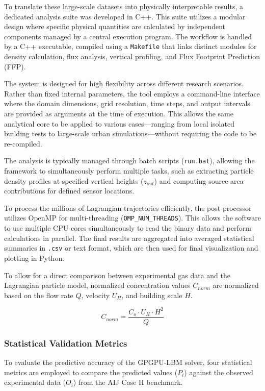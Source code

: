 To translate these large-scale datasets into physically interpretable results, a dedicated analysis suite was developed in C++. This suite utilizes a modular design where specific physical quantities are calculated by independent components managed by a central execution program. The workflow is handled by a C++ executable, compiled using a \texttt{Makefile} that links distinct modules for density calculation, flux analysis, vertical profiling, and Flux Footprint Prediction (FFP).

The system is designed for high flexibility across different research scenarios. Rather than fixed internal parameters, the tool employs a command-line interface where the domain dimensions, grid resolution, time steps, and output intervals are provided as arguments at the time of execution. This allows the same analytical core to be applied to various cases—ranging from local isolated building tests to large-scale urban simulations—without requiring the code to be re-compiled.
 
The analysis is typically managed through batch scripts (\texttt{run.bat}), allowing the framework to simultaneously perform multiple tasks, such as extracting particle density profiles at specified vertical heights ($z_{out}$) and computing source area contributions for defined sensor locations. 

To process the millions of Lagrangian trajectories efficiently, the post-processor utilizes OpenMP for multi-threading (\texttt{OMP\_NUM\_THREADS}). This allows the software to use multiple CPU cores simultaneously to read the binary data and perform calculations in parallel. The final results are aggregated into averaged statistical summaries in \texttt{.csv} or text format, which are then used for final visualization and plotting in Python.

To allow for a direct comparison between experimental gas data and the Lagrangian particle model, normalized concentration values $C_{norm}$ are normalized based on the flow rate $Q$, velocity $U_H$, and building scale $H$.

\begin{equation}
    C_{norm} = \frac{C_o \cdot U_H \cdot H^2}{Q}
\end{equation}

\subsubsection{Statistical Validation Metrics}

To evaluate the predictive accuracy of the GPGPU-LBM solver, four statistical metrics are employed to compare the predicted values ($P_i$) against the observed experimental data ($O_i$) from the AIJ Case H benchmark.

